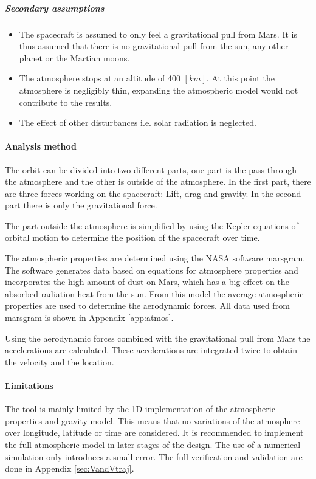  \subparagraph{Secondary assumptions}
 \begin{itemize}
 \item The spacecraft is assumed to only feel a gravitational pull from Mars. It is thus assumed that there is no gravitational pull from the sun, any other planet or the Martian moons.
 \item The atmosphere stops at an altitude of 400 $\left[km\right]$. At this point the atmosphere is negligibly thin, expanding the atmospheric model would not contribute to the results.
 \item The effect of other disturbances i.e. solar radiation is neglected.
 \end{itemize}

\paragraph{Analysis method}
The orbit can be divided into two different parts, one part is the pass through the atmosphere and the other is outside of the atmosphere. In the first part, there are three forces working on the spacecraft: Lift, drag and gravity. In the second part there is only the gravitational force.

The part outside the atmosphere is simplified by using the Kepler equations of orbital motion to determine the position of the spacecraft over time.

The atmospheric properties are determined using the NASA software \gls{marsgram}. The software generates data based on equations for atmosphere properties and incorporates the high amount of dust on Mars, which has a big effect on the absorbed radiation heat from the sun. From this model the average atmospheric properties are used to determine the aerodynamic forces. All data used from \gls{marsgram} is shown in Appendix \ref{app:atmos}. 

Using the aerodynamic forces combined with the gravitational pull from Mars the accelerations are calculated. These accelerations are integrated twice to obtain the velocity and the location.

\paragraph{Limitations}
The tool is mainly limited by the 1D implementation of the atmospheric properties and gravity model. This means that no variations of the atmosphere over longitude, latitude or time are considered. It is recommended to implement the full atmospheric model in later stages of the design. The use of a numerical simulation only introduces a small error. The full verification and validation are done in Appendix \ref{sec:VandVtraj}.